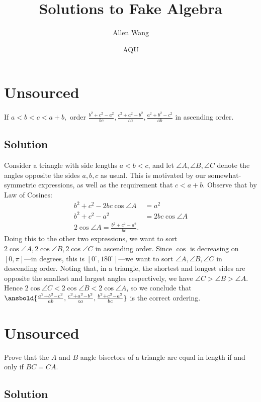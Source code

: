\documentclass{article}
\title{Solutions to Fake Algebra}
\author{Allen Wang}
\date{AQU}
\begin{document}
\maketitle

\toc

\pagebreak\section{Unsourced}

If $a<b<c<a+b,$ order $\frac{b^2+c^2-a^2}{bc},\frac{c^2+a^2-b^2}{ca},\frac{a^2+b^2-c^2}{ab}$ in ascending order.

\subsection{Solution}

Consider a triangle with side lengths $a<b<c$, and let $\angle A,\angle B,\angle C$ denote the angles opposite the sides $a,b,c$ as usual. This is motivated by our somewhat-symmetric expressions, as well as the requirement that $c<a+b$. Observe that by Law of Cosines:
\begin{align*}
    b^2+c^2-2bc\cos \angle A&=a^2\\
    b^2+c^2-a^2&=2bc\cos\angle A\\
    2\cos \angle A=\frac{b^2+c^2-a^2}{bc}.
\end{align*}
Doing this to the other two expressions, we want to sort $2\cos \angle A,2\cos\angle B, 2\cos\angle C$ in ascending order. Since $\cos$ is decreasing on $[0,\pi]$—in degrees, this is $[0^\circ,180^\circ]$—we want to sort $\angle A,\angle B,\angle C$ in descending order. Noting that, in a triangle, the shortest and longest sides are opposite the smallest and largest angles respectively, we have $\angle C>\angle B>\angle A$. Hence $2\cos\angle C<2\cos\angle B<2\cos\angle A$, so we conclude that $\ansbold{\frac{a^2+b^2-c^2}{ab},\frac{c^2+a^2-b^2}{ca},\frac{b^2+c^2-a^2}{bc}}$ is the correct ordering.

\pagebreak\section{Unsourced}
Prove that the $A$ and $B$ angle bisectors of a triangle are equal in length if and only if $BC=CA.$

\subsection{Solution}
\end{document}

